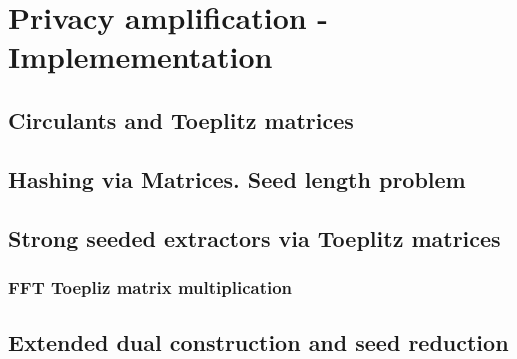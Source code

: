 \chapter{Privacy amplification - Implemementation} \label{chap:PA_impl} %

\section{Circulants and Toeplitz matrices}

\section{Hashing via Matrices. Seed length problem}

\section{Strong seeded extractors via Toeplitz matrices}

\subsection{FFT Toepliz matrix multiplication}

\section{Extended dual construction and seed reduction}

